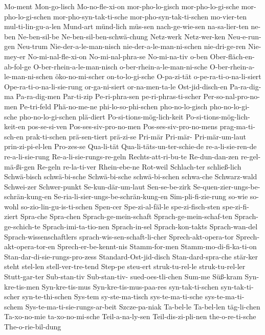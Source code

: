 {Mo-ment
Mon-go-lisch
Mo-no-fle-xi-on
mor-pho-lo-gisch
mor-pho-lo-gi-sche
mor-pho-lo-gi-schen
mor-pho-syn-tak-ti-sche
mor-pho-syn-tak-ti-schen
mo-vier-ten
mul-ti-lin-gu-a-len
Mund-art
münd-lich
müs-sen
nach-ge-wie-sen
na-sa-lier-ten
ne-ben
Ne-ben-sil-be
Ne-ben-sil-ben-schwä-chung
Netz-werk
Netz-wer-ken
Neu-e-run-gen
Neu-trum
Nie-der-a-le-man-nisch
nie-der-a-le-man-ni-schen
nie-dri-ge-ren
Nie-mey-er
No-mi-nal-fle-xi-on
No-mi-nal-phra-se
No-mi-na-tiv
o-ben
Ober-fläch-en-ab-fol-ge
O-ber-rhein-a-le-man-nisch
o-ber-rhein-a-le-man-ni-sche
O-ber-rhein-a-le-man-ni-schen
öko-no-mi-scher
on-to-lo-gi-sche
O-pa-zi-tät
o-pe-ra-ti-o-na-li-siert
Ope-ra-ti-o-na-li-sie-rung
or-ga-ni-siert
or-na-men-ta-le
Ost-jid-disch-en
Pa-ra-dig-ma
Pa-ra-dig-men
Par-ti-zip
Pe-ri-phra-sen
pe-ri-phras-ti-scher
Per-so-nal-pro-no-men
Pe-tri-feld
Phä-no-me-ne
phi-lo-so-phi-schen
pho-no-lo-gisch
pho-no-lo-gi-sche
pho-no-lo-gi-schen
plä-diert
Po-si-tions-mög-lich-keit
Po-si-tions-mög-lich-keit-en
pos-se-si-ven
Pos-ses-siv-pro-no-men
Pos-ses-siv-pro-no-mens
prag-ma-ti-sch-en
prak-ti-schen
prä-sen-tiert
prä-zi-se
Pri-mär
Pri-mär-
Pri-mär-um-laut
prin-zi-pi-el-len
Pro-zes-se
Qua-li-tät
Qua-li-täts-un-ter-schie-de
re-a-li-sie-ren-de
re-a-li-sie-rung
Re-a-li-sie-rungs-re-geln
Rechts-att-ri-bu-te
Re-dun-dan-zen
re-gel-mä-ßi-gen
Re-geln
re-la-ti-ver
Rhein-ebe-ne
Rot-weil
Schlach-ter
schließ-lich
Schwä-bisch
schwä-bi-sche
Schwä-bi-sche
schwä-bi-schen
schwa-che
Schwarz-wald
Schwei-zer
Schwer-punkt
Se-kun-där-um-laut
Sen-se-be-zirk
Se-quen-zier-ungs-be-schrän-kung-en
Se-ria-li-sier-ungs-be-schrän-kung-en 
Sim-pli-fi-zie-rung
so-wie
so-wohl
so-zio-lin-gu-is-ti-schen
Spen-cer
Spe-zi-al-fäl-le
spe-zi-fisch-sten
spe-zi-fi-ziert
Spra-che
Spra-chen
Sprach-ge-mein-schaft
Sprach-ge-mein-schaf-ten
Sprach-ge-schich-te
Sprach-imi-ta-tio-nen
Sprach-in-sel
Sprach-kon-takts
Sprach-wan-del
Sprach-wissenschaftlers
sprach-wis-sen-schaft-li-cher
Sprech-akt-opera-tor
Sprech-akt-opera-tor-en
Sprech-er-be-kennt-nis 
Stamm-for-men
Stamm-mo-di-fi-ka-ti-on
Stan-dar-di-sie-rungs-pro-zess
Standard-Ost-jid-disch
Stan-dard-spra-che
stär-ker
steht
stel-len
stell-ver-tre-tend
Step-pe
steu-ert
struk-tu-rel-le
struk-tu-rel-ler
Stutt-gar-ter
Sub-stan-tiv
Sub-stan-tiv-
sued-oes-tli-chen
Sum-me
Süß-kram
Syn-kre-tis-men
Syn-kre-tis-mus
Syn-kre-tis-mus-paa-res
syn-tak-ti-schen
syn-tak-ti-scher
syn-te-thi-schen
Sys-tem
sy-ste-ma-tisch
sys-te-ma-ti-sche
sys-te-ma-ti-schem
Sys-te-ma-ti-sie-rungs-ar-beit
Szcze-pa-niak
Ta-bel-le
Ta-bel-len
täg-li-chen
Ta-xo-no-mie
ta-xo-no-mi-sche
Teil-a-na-ly-sen
Teil-dis-zi-pli-nen
the-o-re-ti-sche
The-o-rie-bil-dung
}
